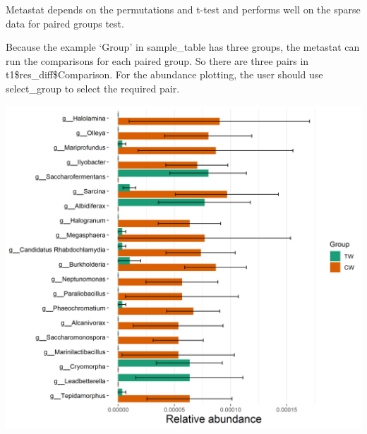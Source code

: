 \documentclass[
]{book}
\newenvironment{Shaded}{\begin{snugshade}}{\end{snugshade}}
\newcommand{\AttributeTok}[1]{\textcolor[rgb]{0.77,0.63,0.00}{#1}}
\newcommand{\CommentTok}[1]{\textcolor[rgb]{0.56,0.35,0.01}{\textit{#1}}}
\newcommand{\DecValTok}[1]{\textcolor[rgb]{0.00,0.00,0.81}{#1}}
\newcommand{\FunctionTok}[1]{\textcolor[rgb]{0.00,0.00,0.00}{#1}}
\newcommand{\NormalTok}[1]{#1}
\newcommand{\OtherTok}[1]{\textcolor[rgb]{0.56,0.35,0.01}{#1}}
\newcommand{\SpecialCharTok}[1]{\textcolor[rgb]{0.00,0.00,0.00}{#1}}
\newcommand{\StringTok}[1]{\textcolor[rgb]{0.31,0.60,0.02}{#1}}
\begin{document}
Metastat depends on the permutations and t-test and performs well on the sparse data for paired groups test.

\begin{Shaded}
\end{Shaded}

Because the example `Group' in sample\_table has three groups,
the metastat can run the comparisons for each paired group. So there are three pairs in t1\$res\_diff\$Comparison.
For the abundance plotting, the user should use select\_group to select the required pair.

\begin{Shaded}
\end{Shaded}

\begin{center}\includegraphics[width=650px]{Images/plot_metastat_1} \end{center}
\end{document}
